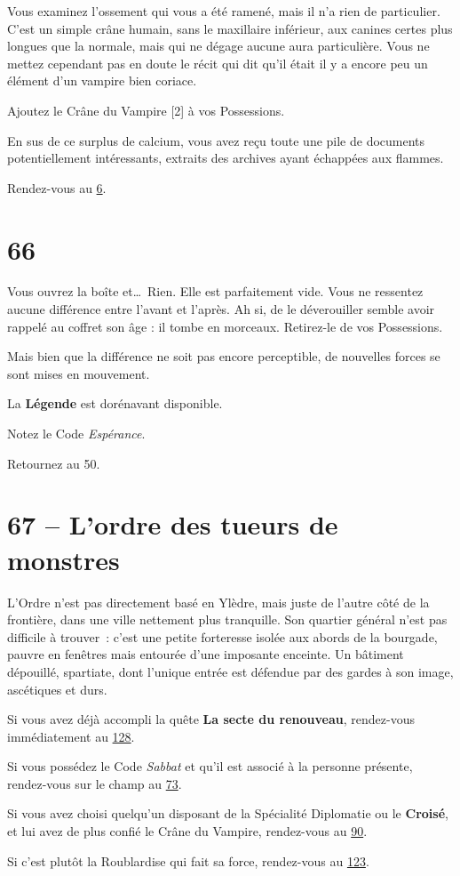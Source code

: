 \documentclass{report}
\newcommand{\gsection}[1]{
    \section{#1}
    \label{section-#1}
}
\newcommand{\glink}[1]{\hyperref[section-#1]{#1}}
\newcommand{\hero}[1]{\textbf{#1}}
\begin{document}
Vous examinez l'ossement qui vous a été ramené, mais il n'a rien de particulier. C'est un simple crâne humain, sans le maxillaire inférieur, aux canines certes plus longues que la normale, mais qui ne dégage aucune aura particulière. Vous ne mettez cependant pas en doute le récit qui dit qu'il était il y a encore peu un élément d'un vampire bien coriace.

Ajoutez le Crâne du Vampire [2] à vos Possessions.

En sus de ce surplus de calcium, vous avez reçu toute une pile de documents potentiellement intéressants, extraits des archives ayant échappées aux flammes.

Rendez-vous au \glink{6}.

\gsection{66}

Vous ouvrez la boîte et\dots~Rien. Elle est parfaitement vide. Vous ne ressentez aucune différence entre l'avant et l'après. Ah si, de le déverouiller semble avoir rappelé au coffret son âge : il tombe en morceaux. Retirez-le de vos Possessions.

Mais bien que la différence ne soit pas encore perceptible, de nouvelles forces se sont mises en mouvement.

La \hero{Légende} est dorénavant disponible.

Notez le Code \emph{Espérance}.

Retournez au 50.

\gsection{67 – L'ordre des tueurs de monstres}

L'Ordre n'est pas directement basé en Ylèdre, mais juste de l'autre côté de la frontière, dans une ville nettement plus tranquille. Son quartier général n'est pas difficile à trouver : c'est une petite forteresse isolée aux abords de la bourgade, pauvre en fenêtres mais entourée d'une imposante enceinte. Un bâtiment dépouillé, spartiate, dont l'unique entrée est défendue par des gardes à son image, ascétiques et durs.

Si vous avez déjà accompli la quête \textbf{La secte du renouveau}, rendez-vous immédiatement au \glink{128}.

Si vous possédez le Code \emph{Sabbat} et qu'il est associé à la personne présente, rendez-vous sur le champ au \glink{73}.

Si vous avez choisi quelqu'un disposant de la Spécialité Diplomatie ou le \hero{Croisé}, et lui avez de plus confié le Crâne du Vampire, rendez-vous au \glink{90}.

Si c'est plutôt la Roublardise qui fait sa force, rendez-vous au \glink{123}.
\end{document}

